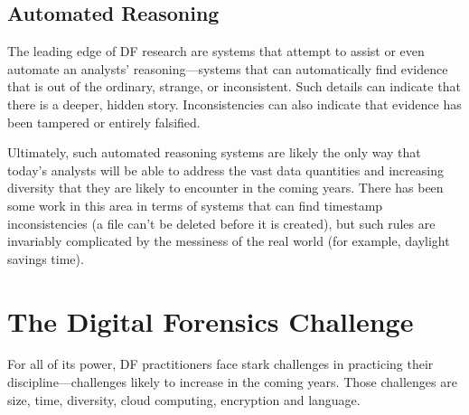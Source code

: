 \subsection{Automated Reasoning}

The leading edge of DF research are systems that
attempt to assist or even automate an analysts' reasoning---systems
that can automatically find evidence that is out of the ordinary,
strange, or inconsistent. Such details can indicate that there is a
deeper, hidden story. Inconsistencies can also indicate that evidence has been
tampered or entirely falsified. 

Ultimately, such automated reasoning systems are likely the only way
that today's analysts will be able to address the vast data
quantities and increasing diversity that they are likely to encounter
in the coming years. There has been some work in this area in
terms of systems that can find timestamp inconsistencies (a file
can't be deleted before it is created), but such rules are invariably
complicated by the messiness of the real world (for example, daylight
savings time). 

\section{The Digital Forensics Challenge}

For all of its power, DF practitioners face stark
challenges in practicing their discipline---challenges likely to
increase in the coming years. Those challenges are size,
time, diversity, cloud computing, encryption and language.

